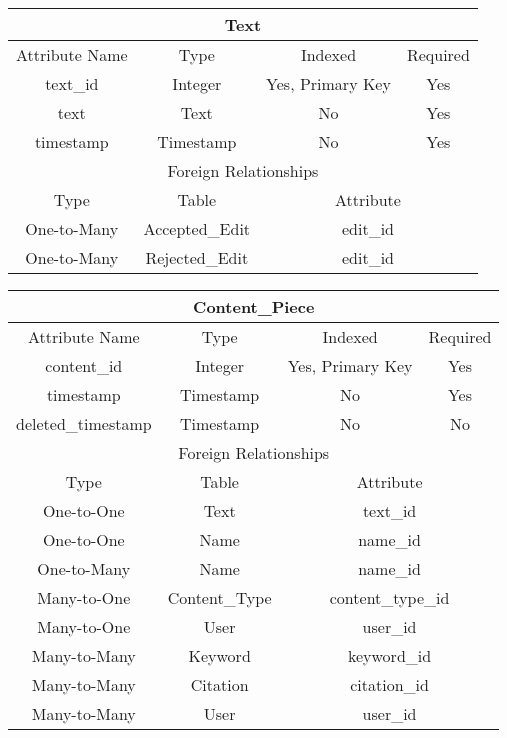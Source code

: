 \documentclass[12pt,letterpaper]{article}
\begin{document}
\vspace{.4cm}
\begin{center}
\label{Text}
\begin{tabular}{|c|c|c|c|}
\hline
\multicolumn{4}{|c|}{Text} \\ \hline
Attribute Name & Type & Indexed & Required \\ \hline
text\_id & Integer & Yes, Primary Key & Yes \\ \hline
text & Text & No & Yes \\ \hline
timestamp & Timestamp & No & Yes \\ \hline
\multicolumn{4}{|c|}{Foreign Relationships} \\ \hline
Type & Table & \multicolumn{2}{c|}{Attribute} \\ \hline
One-to-Many & Accepted\_Edit & \multicolumn{2}{c|}{edit\_id} \\ \hline %
One-to-Many & Rejected\_Edit & \multicolumn{2}{c|}{edit\_id} \\ \hline %
\end{tabular}
\end{center}


\begin{center}
\label{ContentPiece}
\begin{tabular}{|c|c|c|c|}
\hline
\multicolumn{4}{|c|}{Content\_Piece} \\ \hline
\multicolumn{1}{|c|}{Attribute Name} & \multicolumn{1}{c|}{Type} & \multicolumn{1}{c|}{Indexed} & \multicolumn{1}{c|}{Required} \\ \hline
content\_id & Integer & Yes, Primary Key & Yes \\ \hline
timestamp & Timestamp & No & Yes \\ \hline
deleted\_timestamp & Timestamp & No & No \\ \hline
\multicolumn{4}{|c|}{Foreign Relationships} \\ \hline
Type & Table & \multicolumn{2}{c|}{Attribute} \\ \hline
One-to-One & Text & \multicolumn{2}{c|}{text\_id} \\ \hline %
One-to-One & Name & \multicolumn{2}{c|}{name\_id} \\ \hline	%
One-to-Many & Name & \multicolumn{2}{c|}{name\_id} \\ \hline %
Many-to-One & Content\_Type & \multicolumn{2}{c|}{content\_type\_id} \\ \hline %
Many-to-One & User & \multicolumn{2}{c|}{user\_id} \\ \hline %
Many-to-Many & Keyword & \multicolumn{2}{c|}{keyword\_id} \\ \hline	%
Many-to-Many & Citation & \multicolumn{2}{c|}{citation\_id} \\ \hline %
Many-to-Many & User & \multicolumn{2}{c|}{user\_id} \\ \hline %
\end{tabular}
\end{center}
\end{document}
